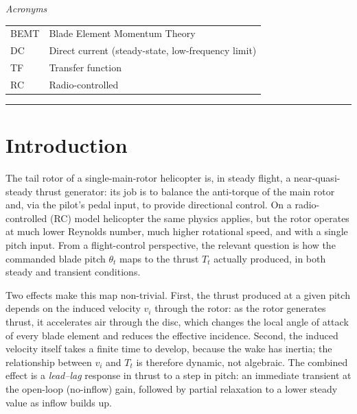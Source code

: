 \documentclass[11pt,a4paper]{article}
\newcommand{\Tt}{T_t}
\newcommand{\thetat}{\theta_t}
\newcommand{\vi}{v_i}
\let\oldsection\section
\renewcommand{\section}{\clearpage\oldsection}
\begin{document}
\vspace{0.5em}
\noindent\textit{Acronyms}
\begin{center}
\renewcommand{\arraystretch}{1.12}
\begin{tabular}{@{}l l@{}}
\toprule
BEMT  & Blade Element Momentum Theory \\
DC    & Direct current (steady-state, low-frequency limit) \\
TF    & Transfer function \\
RC    & Radio-controlled \\
\bottomrule
\end{tabular}
\end{center}

\vspace{1em}
\hrule
\vspace{1em}

\section{Introduction}\label{sec:intro}

The tail rotor of a single-main-rotor helicopter is, in steady flight, a
near-quasi-steady thrust generator: its job is to balance the anti-torque of
the main rotor and, via the pilot's pedal input, to provide directional control.
On a radio-controlled (RC) model helicopter the same physics applies, but
the rotor operates at much lower Reynolds number, much higher rotational
speed, and with a single pitch input. From a flight-control perspective,
the relevant question is how the commanded blade pitch \(\thetat\) maps to the
thrust \(\Tt\) actually produced, in both steady and transient conditions.

Two effects make this map non-trivial. First, the thrust produced at a given
pitch depends on the induced velocity \(\vi\) through the rotor: as the rotor
generates thrust, it accelerates air through the disc, which changes
the local angle of attack of every blade element and reduces the effective
incidence. Second, the induced velocity itself takes a finite time to
develop, because the wake has inertia; the relationship between \(\vi\) and
\(\Tt\) is therefore dynamic, not algebraic. The combined effect is a
\emph{lead--lag} response in thrust to a step in pitch: an immediate
transient at the open-loop (no-inflow) gain, followed by partial relaxation
to a lower steady value as inflow builds up.
\end{document}

